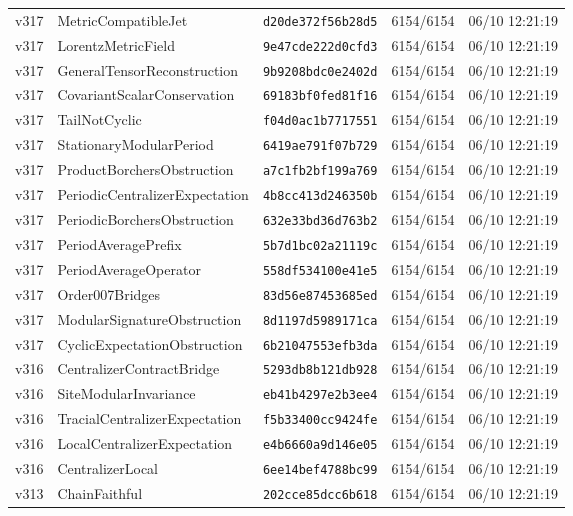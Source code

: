 \documentclass[11pt]{article}
\theoremstyle{definition}\newtheorem{deriv}{Derivation}
\begin{document}
{\begin{longtable}{@{}lllll@{}}
v317 & MetricCompatibleJet & \texttt{d20de372f56b28d5} & 6154/6154 & 06/10 12:21:19 \\
v317 & LorentzMetricField & \texttt{9e47cde222d0cfd3} & 6154/6154 & 06/10 12:21:19 \\
v317 & GeneralTensorReconstruction & \texttt{9b9208bdc0e2402d} & 6154/6154 & 06/10 12:21:19 \\
v317 & CovariantScalarConservation & \texttt{69183bf0fed81f16} & 6154/6154 & 06/10 12:21:19 \\
v317 & TailNotCyclic & \texttt{f04d0ac1b7717551} & 6154/6154 & 06/10 12:21:19 \\
v317 & StationaryModularPeriod & \texttt{6419ae791f07b729} & 6154/6154 & 06/10 12:21:19 \\
v317 & ProductBorchersObstruction & \texttt{a7c1fb2bf199a769} & 6154/6154 & 06/10 12:21:19 \\
v317 & PeriodicCentralizerExpectation & \texttt{4b8cc413d246350b} & 6154/6154 & 06/10 12:21:19 \\
v317 & PeriodicBorchersObstruction & \texttt{632e33bd36d763b2} & 6154/6154 & 06/10 12:21:19 \\
v317 & PeriodAveragePrefix & \texttt{5b7d1bc02a21119c} & 6154/6154 & 06/10 12:21:19 \\
v317 & PeriodAverageOperator & \texttt{558df534100e41e5} & 6154/6154 & 06/10 12:21:19 \\
v317 & Order007Bridges & \texttt{83d56e87453685ed} & 6154/6154 & 06/10 12:21:19 \\
v317 & ModularSignatureObstruction & \texttt{8d1197d5989171ca} & 6154/6154 & 06/10 12:21:19 \\
v317 & CyclicExpectationObstruction & \texttt{6b21047553efb3da} & 6154/6154 & 06/10 12:21:19 \\
v316 & CentralizerContractBridge & \texttt{5293db8b121db928} & 6154/6154 & 06/10 12:21:19 \\
v316 & SiteModularInvariance & \texttt{eb41b4297e2b3ee4} & 6154/6154 & 06/10 12:21:19 \\
v316 & TracialCentralizerExpectation & \texttt{f5b33400cc9424fe} & 6154/6154 & 06/10 12:21:19 \\
v316 & LocalCentralizerExpectation & \texttt{e4b6660a9d146e05} & 6154/6154 & 06/10 12:21:19 \\
v316 & CentralizerLocal & \texttt{6ee14bef4788bc99} & 6154/6154 & 06/10 12:21:19 \\
v313 & ChainFaithful & \texttt{202cce85dcc6b618} & 6154/6154 & 06/10 12:21:19 \\

\end{longtable}}
\end{document}
